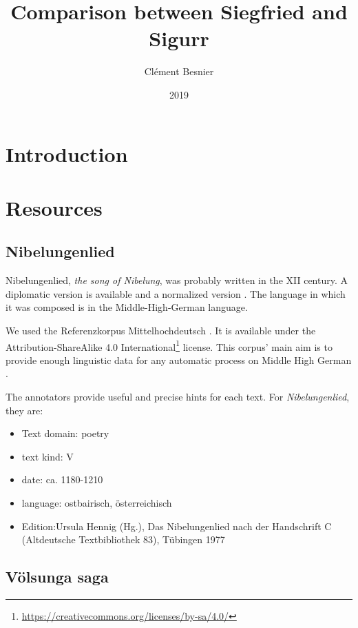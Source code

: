 \documentclass{article}
\title{Comparison between Siegfried and Sigur{\dh}r}
\author{Clément Besnier}
\date{2019}
\begin{document}
\maketitle

\section{Introduction}

\section{Resources}

\subsection{Nibelungenlied}

Nibelungenlied, \textit{the song of Nibelung}, was probably written in the XII century. 
A diplomatic version is available \cite{nibdiplo} and a normalized version  \cite{nibnor}. The language in which it was composed is in the Middle-High-German language.

We used the Referenzkorpus Mittelhochdeutsch \cite{refkormhd}. It is available under the Attribution-ShareAlike 4.0 International\footnote{\href{https://creativecommons.org/licenses/by-sa/4.0/}{https://creativecommons.org/licenses/by-sa/4.0/}} license. This corpus' main aim is to provide enough linguistic data for any automatic process on Middle High German \cite{dipper2015annotierte}.


The annotators provide useful and precise hints for each text. For \textit{Nibelungenlied}, they are: 
\begin{itemize}
    \item Text domain: poetry
    \item text kind: V
    \item date: ca. 1180-1210
    \item language: ostbairisch, österreichisch
    \item Edition:Ursula Hennig (Hg.), Das Nibelungenlied nach der Handschrift C (Altdeutsche Textbibliothek 83), Tübingen 1977
\end{itemize}


\subsection{Völsunga saga}

\cite{volsungasaga}


\nocite{*}


\end{document}
